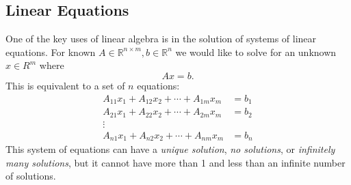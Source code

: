 \subsection{Linear Equations}
One of the key uses of linear algebra is in the solution of systems of linear
equations. For known $A\in \mathbb{R}^{n\times m},b\in \mathbb{R}^{n}$ we would
like to solve for an unknown $x\in R^{m}$ where
\[Ax=b.\]
This is equivalent to a set of $n$ equations:
\begin{align*}
    A_{11} x_1 + A_{12} x_2 +\cdots  + A_{1m} x_m &= b_1 \\
    A_{21} x_1 + A_{22} x_2 +\cdots + A_{2m} x_m &= b_2 \\
    \vdots\\
    A_{n1} x_1 + A_{n2} x_2 +\cdots + A_{nm} x_m &= b_n
\end{align*}
This system of equations can have a \emph{unique solution}, \emph{no
solutions}, or \emph{infinitely many solutions}, but it cannot have more than 1
and less than an infinite number of solutions. 


